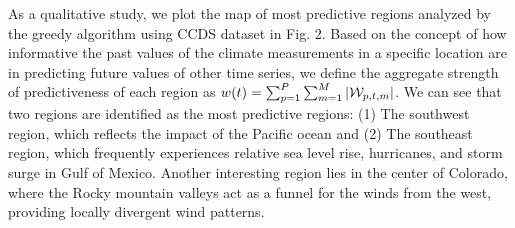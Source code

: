 As a qualitative study, we plot the map of most predictive regions analyzed by the greedy algorithm using CCDS dataset in Fig. 2. Based on the concept of how informative the past values of the climate measurements in a specific location are in predicting future values of other time series, we define the aggregate strength of predictiveness of each region as $w(t) = \sum_{p=1}^{P}\sum_{m=1}^{M}|{\mathcal W}_{p, t, m}|$. We can see that two regions are identified as the most predictive regions: (1) The southwest region, which reflects the impact of the Pacific ocean and (2) The southeast region, which frequently experiences relative sea level rise, hurricanes, and storm surge in Gulf of Mexico.  Another interesting region lies in the center of Colorado, where the Rocky mountain valleys act as a funnel for the winds from the west, providing locally divergent wind patterns.



